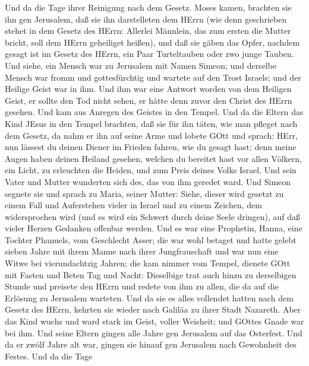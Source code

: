  Und da die Tage ihrer Reinigung nach dem Gesetz. Moses
kamen, brachten sie ihn gen Jerusalem, daß sie ihn darstelleten dem
HErrn  (wie denn geschrieben stehet in dem Gesetz des
HErrn: Allerlei Männlein, das zum ersten die Mutter bricht, soll dem
HErrn geheiliget heißen),  und daß sie gäben das Opfer,
nachdem gesagt ist im Gesetz des HErrn, ein Paar Turteltauben oder zwo
junge Tauben.  Und siehe, ein Mensch war zu Jerusalem mit
Namen Simeon; und derselbe Mensch war fromm und gottesfürchtig und
wartete auf den Trost Israels; und der Heilige Geist war in ihm.
 Und ihm war eine Antwort worden von dem Heiligen Geist, er
sollte den Tod nicht sehen, er hätte denn zuvor den Christ des HErrn
gesehen.  Und kam aus Anregen des Geistes in den Tempel.
Und da die Eltern das Kind JEsus in den Tempel brachten, daß sie für ihn
täten, wie man pfleget nach dem Gesetz,  da nahm er ihn auf
seine Arme und lobete GOtt und sprach:  HErr, nun lässest
du deinen Diener im Frieden fahren, wie du gesagt hast; 
denn meine Augen haben deinen Heiland gesehen,  welchen du
bereitet hast vor allen Völkern,  ein Licht, zu erleuchten
die Heiden, und zum Preis deines Volks Israel.  Und sein
Vater und Mutter wunderten sich des, das von ihm geredet ward.
 Und Simeon segnete sie und sprach zu Maria, seiner Mutter:
Siehe, dieser wird gesetzt zu einem Fall und Auferstehen vieler in
Israel und zu einem Zeichen, dem widersprochen wird  (und
es wird ein Schwert durch deine Seele dringen), auf daß vieler Herzen
Gedanken offenbar werden.  Und es war eine Prophetin,
Hanna, eine Tochter Phanuels, vom Geschlecht Asser; die war wohl betaget
und hatte gelebt sieben Jahre mit ihrem Manne nach ihrer Jungfrauschaft
 und war nun eine Witwe bei vierundachtzig Jahren; die kam
nimmer vom Tempel, dienete GOtt mit Fasten und Beten Tag und Nacht:
 Dieselbige trat auch hinzu zu derselbigen Stunde und
preisete den HErrn und redete von ihm zu allen, die da auf die Erlösung
zu Jerusalem warteten.  Und da sie es alles vollendet
hatten nach dem Gesetz des HErrn, kehrten sie wieder nach Galiläa zu
ihrer Stadt Nazareth.  Aber das Kind wuchs und ward stark
im Geist, voller Weisheit; und GOttes Gnade war bei ihm. 
Und seine Eltern gingen alle Jahre gen Jerusalem auf das Osterfest.
 Und da er zwölf Jahre alt war, gingen sie hinauf gen
Jerusalem nach Gewohnheit des Festes.  Und da die Tage
